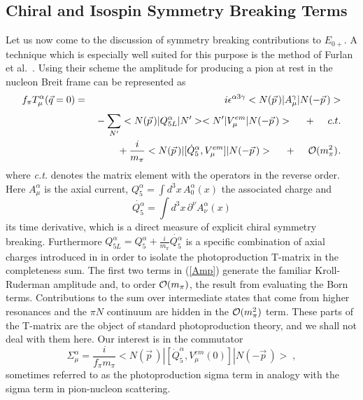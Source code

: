 \subsection{Chiral and Isospin Symmetry Breaking Terms}
Let us now come to the discussion of symmetry breaking contributions to
$E_{0+}$. A technique which is especially  well suited for this purpose is the
method of Furlan et al.\ \cite{Fur}. Using their scheme  the amplitude for
producing a pion at rest in the nucleon Breit frame can be represented as
\newpage
\begin{eqnarray}
\label{Amp}
f_{\pi} T_{\mu}^{\alpha}(\vec{q}=0) &=&
 i \epsilon^{\alpha 3 \gamma} <N(\vec{p}\,)|A_{\mu}^{\gamma}|N(-\vec{p}\,)> 
  \nonumber \\
   & &\mbox{}-\sum_{N'}^{\mbox{}}<N(\vec{p}\,)| Q_{5L}^{\alpha}|N'>
   <N'|V_{\mu}^{em}|N(-\vec{p}\,)>
  \hspace{0.5cm} + \hspace{0.5cm}  c.t.   \\ \vspace{0.4cm}
   & &\mbox{}  + \frac{i}{m_\pi}<N(\vec{p}\,)|[\dot{Q}_5^{\alpha},V_{\mu}^{em}]
    |N(-\vec{p}\,)> \hspace{0.5cm}
    + \hspace{0.5cm} {\cal O}(m_{\pi}^2)^{\mbox{}} \nonumber . 
\end{eqnarray}
where {\em c.t.} denotes the matrix element with the operators in the
reverse order.
Here $A^{\alpha}_{\mu}$ is the axial current, $Q_5^{\alpha}=\int d^3 x\,
A_0^{\alpha}(x)$ the associated charge and 
\begin{equation}
 \dot{Q_5^{\alpha}}=\int d^3 x\, \partial^{\nu}A_{\nu}^{\alpha}(x)
\end{equation}
its time derivative, which is a direct measure of explicit chiral 
symmetry breaking. Furthermore $Q^{\alpha}_{5L}=
Q^{\alpha}_5 + \frac{i}{m_\pi}\dot{Q_5^{\alpha}}$ is a specific 
combination of axial charges introduced in \cite{Fur} in order to
isolate the photoproduction T-matrix in the completeness sum.
The first two terms in (\ref{Amp}) generate the familiar Kroll-Ruderman
amplitude and, to order ${\cal O}(m_\pi)$, the result from evaluating the 
Born terms. Contributions to the sum over intermediate states
that come from higher resonances and the $\pi N$ continuum  are hidden
in the ${\cal O}(m_{\pi}^2)$ term. These parts of the T-matrix are 
the object of standard photoproduction theory, and we shall not deal 
with them here. Our interest is in the commutator
\begin{equation}
\label{Sig}
 \Sigma_{\mu}^\alpha = \frac{i}{f_\pi m_\pi} <N(\vec{p}\,)|
  [\dot{Q}_5^{\alpha},V_{\mu}^{em}(0)]|N(-\vec{p}\,)> \; ,
\end{equation}
sometimes referred to as the photoproduction sigma term in analogy
with the sigma term in pion-nucleon scattering.

